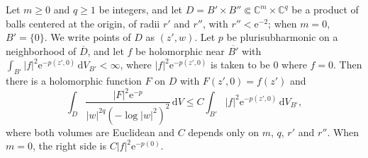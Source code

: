 \begin{lemma}\label{lem:local-critical-gain-extension}
Let $m\geq0$ and $q\geq1$ be integers, and let $D=B'\times B''\Subset\mathbb C^{m}\times\mathbb C^q$ be a product of balls centered at the origin, of radii $r'$ and $r''$, with $r''<\mathrm e^{-2}$; when $m=0$, $B'=\{0\}$. We write points of $D$ as $(z',w)$. Let $p$ be plurisubharmonic on a neighborhood of $\overline D$, and let $f$ be holomorphic near $\overline{B'}$ with $\int_{B'}|f|^2\mathrm e^{-p(z',0)}\,\mathrm dV_{B'}<\infty$, where $|f|^2\mathrm e^{-p(z',0)}$ is taken to be $0$ where $f=0$. Then there is a holomorphic function $F$ on $D$ with $F(z',0)=f(z')$ and
\begin{equation}\label{eq:local-critical-gain-extension}
 \int_D\frac{|F|^2\mathrm e^{-p}}{|w|^{2q}(-\log|w|^2)^2}\,\mathrm dV
       \leq C\int_{B'}|f|^2\mathrm e^{-p(z',0)}\,\mathrm dV_{B'},
\end{equation}
where both volumes are Euclidean and $C$ depends only on $m$, $q$, $r'$ and $r''$. When $m=0$, the right side is $C|f|^2\mathrm e^{-p(0)}$.
\end{lemma}
